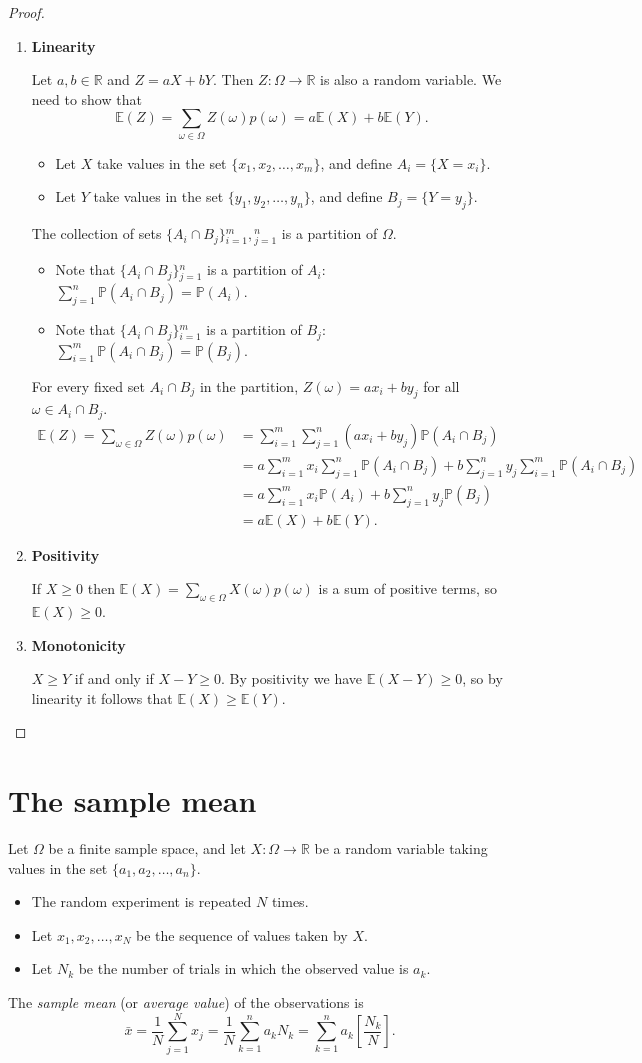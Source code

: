 \documentclass[lecture]{csm}
\newcommand{\R}{\mathbb{R}}
\newcommand{\prob}{\mathbb{P}}
\newcommand{\expe}{\mathbb{E}}
\def\it{\item}
\def\bit{\begin{itemize}}
\def\eit{\end{itemize}}
\def\ben{\begin{enumerate}}
\def\een{\end{enumerate}}
\begin{document}
\begin{proof}
\ben
\it\textbf{Linearity}\par
Let $a,b\in\R$ and $Z=aX+bY$. Then $Z:\Omega\to\R$ is also a random variable. We need to show that
\[
\expe(Z)=\sum_{\omega\in\Omega} Z(\omega)p(\omega) = a\expe(X)+b\expe(Y).
\]
\bit
\it Let $X$ take values in the set $\{x_1,x_2,\ldots,x_m\}$, and define $A_i = \{X=x_i\}$.
\it Let $Y$ take values in the set $\{y_1,y_2,\ldots,y_n\}$, and define $B_j = \{Y=y_j\}$.
\eit

The collection of sets $\{A_i\cap B_j\}{_{i=1}^m},{_{j=1}^n}$ is a partition of $\Omega$.
\bit
\it Note that $\{A_i\cap B_j\}{_{j=1}^n}$ is a partition of $A_i$: $\sum_{j=1}^{n}\prob(A_i\cap B_j) = \prob(A_i)$.
\it Note that $\{A_i\cap B_j\}{_{i=1}^m}$ is a partition of $B_j$: $\sum_{i=1}^{m}\prob(A_i\cap B_j) = \prob(B_j)$.
\eit
\break %
For every fixed set $A_i\cap B_j$ in the partition, $Z(\omega) = ax_i + by_j$ for all $\omega\in A_i\cap B_j$.
\begin{align*}
\expe(Z) = \sum_{\omega\in\Omega} Z(\omega)p(\omega)
	& = \sum_{i=1}^{m}\sum_{j=1}^{n} (ax_i + by_j) \prob(A_i\cap B_j) \\
	& = a\sum_{i=1}^{m} x_i \sum_{j=1}^{n}\prob(A_i\cap B_j) + b\sum_{j=1}^{n} y_j \sum_{i=1}^{m} \prob(A_i\cap B_j) \\ 
	& = a\sum_{i=1}^{m} x_i\prob(A_i) + b\sum_{j=1}^{n} y_j\prob(B_j) \\
	& = a\expe(X) + b\expe(Y).
\end{align*}
\it\textbf{Positivity}\par
If $X\geq 0$ then $\expe(X)=\sum_{\omega\in\Omega}X(\omega)p(\omega)$ is a sum of positive terms, so $\expe(X)\geq 0$.
\it\textbf{Monotonicity}\par
$X\geq Y$ if and only if $X-Y\geq 0$. By positivity we have $\expe(X-Y)\geq 0$, so by linearity it follows that $\expe(X)\geq\expe(Y)$.
\een
\end{proof}

\section{The sample mean}
Let $\Omega$ be a finite sample space, and let $X:\Omega\to\R$ be a random variable taking values in the set $\{a_1,a_2,\ldots,a_n\}$.
\bit 
\it The random experiment is repeated $N$ times.
\it Let $x_1,x_2,\ldots,x_N$ be the sequence of values taken by $X$.
\it Let $N_k$ be the number of trials in which the observed value is $a_k$.
\eit
The \emph{sample mean} (or \emph{average value}) of the observations is
\[
\bar{x} = \frac{1}{N}\sum_{j=1}^N x_j = \frac{1}{N}\sum_{k=1}^n a_k N_k = \sum_{k=1}^n a_k\left[\frac{N_k}{N}\right].
\]
\end{document}
